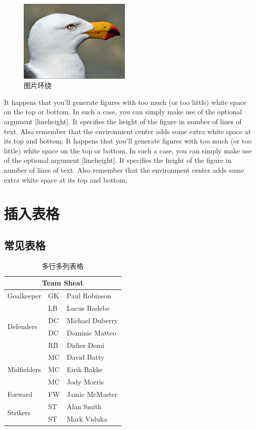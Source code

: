 \documentclass[fancyhdr,adobefonts,oneside,hyperref,openany,a4paper,UTF8]{ctexbook}
\begin{document}
\begin{figure}
  \vspace{-20pt}
  \begin{center}
    \includegraphics[width=0.48\textwidth]{img/gull}
  \end{center}
  \vspace{-20pt}
  \caption{图片环绕}
  \vspace{-10pt}
\end{figure}
It happens that you'll generate figures with too much (or too little) white space on the top or bottom. In such a case, you can simply make use of the optional argument [lineheight]. It specifies the height of the figure in number of lines of text. Also remember that the environment center adds some extra white space at its top and bottom;
It happens that you'll generate figures with too much (or too little) white space on the top or bottom. In such a case, you can simply make use of the optional argument [lineheight]. It specifies the height of the figure in number of lines of text. Also remember that the environment center adds some extra white space at its top and bottom;

\chapter{插入表格}
\section{常见表格}

\begin{table}[htp]
\centering
\caption{\label{tab:multicolumn}多行多列表格}
\begin{tabular}{|l|l|l|}
\hline
\multicolumn{3}{|c|}{Team Sheat} \\
\hline
Goalkeeper & GK & Paul Robinson \\
\hline
\multirow{4}{*}{Defenders} & LB & Lucus Radebe \\ & DC & Michael Duberry \\ & DC & Dominic Matteo \\ & RB & Didier Domi \\
\hline
\multirow{3}{*}{Midfielders} & MC & David Batty \\ & MC & Eirik Bakke \\ & MC & Jody Morris \\
\hline
Forward & FW & Jamie McMaster \\
\hline
\multirow{2}{*}{Strikers} & ST & Alan Smith \\ & ST & Mark Viduka \\
\hline
\end{tabular}
\end{table}
\end{document}
